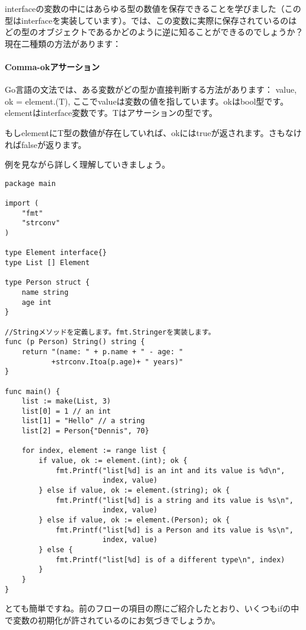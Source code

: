 interfaceの変数の中にはあらゆる型の数値を保存できることを学びました（この型はinterfaceを実装しています）。では、この変数に実際に保存されているのはどの型のオブジェクトであるかどのように逆に知ることができるのでしょうか？現在二種類の方法があります：

\paragraph{Comma-okアサーション}

 Go言語の文法では、ある変数がどの型か直接判断する方法があります： value, ok = element.(T), ここでvalueは変数の値を指しています。okはbool型です。elementはinterface変数です。Tはアサーションの型です。

もしelementにT型の数値が存在していれば、okにはtrueが返されます。さもなければfalseが返ります。

例を見ながら詳しく理解していきましょう。

\begin{lstlisting}[numbers=none]
package main

import (
    "fmt"
    "strconv"
)

type Element interface{}
type List [] Element

type Person struct {
    name string
    age int
}

//Stringメソッドを定義します。fmt.Stringerを実装します。
func (p Person) String() string {
    return "(name: " + p.name + " - age: "
           +strconv.Itoa(p.age)+ " years)"
}

func main() {
    list := make(List, 3)
    list[0] = 1 // an int
    list[1] = "Hello" // a string
    list[2] = Person{"Dennis", 70}

    for index, element := range list {
        if value, ok := element.(int); ok {
            fmt.Printf("list[%d] is an int and its value is %d\n",
                       index, value)
        } else if value, ok := element.(string); ok {
            fmt.Printf("list[%d] is a string and its value is %s\n",
                       index, value)
        } else if value, ok := element.(Person); ok {
            fmt.Printf("list[%d] is a Person and its value is %s\n",
                       index, value)
        } else {
            fmt.Printf("list[%d] is of a different type\n", index)
        }
    }
}
\end{lstlisting}

 とても簡単ですね。前のフローの項目の際にご紹介したとおり、いくつもifの中で変数の初期化が許されているのにお気づきでしょうか。

